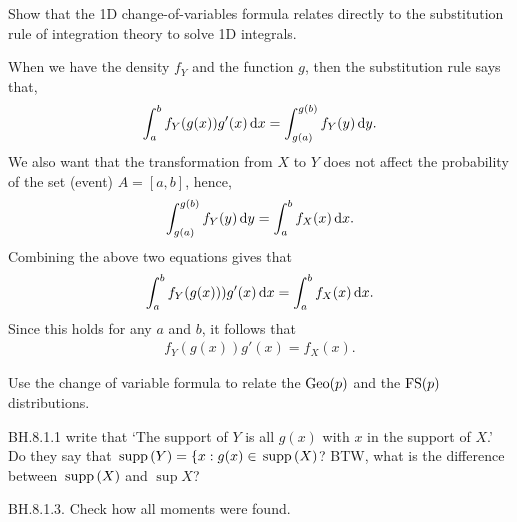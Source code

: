 \begin{exercise}
Show that the 1D change-of-variables formula relates directly to the substitution rule of integration theory to solve 1D integrals.
\begin{solution}
When we have the density  $f_{Y}$ and the function $g$, then the substitution rule says that,
\begin{align*}
\int_{a}^b f_{Y}(g(x)) g'(x)\,\textrm{d}x = \int_{g(a)}^{g(b)} f_{Y}(y) \,\textrm{d}y.
\end{align*}
We also want that the transformation from $X$ to $Y$ does not affect the probability of the set (event) $A = [a,b]$, hence,
\begin{align*}
\int_{g(a)}^{g(b)} f_{Y}(y) \,\textrm{d}y = \int_{a}^{b} f_{X}(x) \,\textrm{d}x.
\end{align*}
Combining the above two equations gives that
\begin{align*}
\int_{a}^{b} f_{Y}(g(x))) g'(x) \,\textrm{d}x = \int_{a}^{b} f_{X}(x) \,\textrm{d}x.
\end{align*}
Since this holds for any $a$ and $b$, it follows that
\begin{align*}
f_{Y}(g(x)) g'(x) = f_{X}(x).
\end{align*}
\end{solution}
\end{exercise}

\begin{exercise}
Use the change of variable formula to relate the $\mathrm{Geo}(p)$ and the $\mathrm{FS}(p)$ distributions.
\begin{hint}
\end{hint}
\begin{solution}
\end{solution}
\end{exercise}

\begin{exercise}
BH.8.1.1 write that `The support of $Y$ is all $g(x)$ with $x$ in the support of $X$.' Do they say that $\,\mathrm{supp}\left(Y\right) = \{x : g(x) \in \,\mathrm{supp}\left(X\right)$? BTW, what is the difference between $\,\mathrm{supp}\left(X\right)$ and $\sup{X}$?
\begin{hint}
\end{hint}
\begin{solution}
\end{solution}
\end{exercise}


\begin{exercise}
BH.8.1.3. Check how all moments were found.
\begin{hint}
\end{hint}
\begin{solution}
\end{solution}
\end{exercise}

